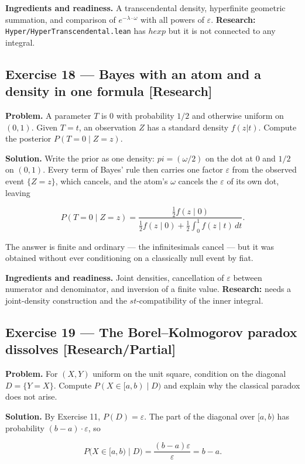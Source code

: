 \documentclass[11pt]{article}
\newcommand{\eps}{\varepsilon}
\renewcommand{\epsilon}{\varepsilon}
\begin{document}
\textbf{Ingredients and readiness.} A transcendental density, hyperfinite geometric
summation, and comparison of $e^{-\lambda\cdot \omega}$ with all powers of $\eps$.
\textbf{Research:} \texttt{Hyper/HyperTranscendental.lean} has $hexp$ but it is not
connected to any integral.


\subsection*{Exercise 18 --- Bayes with an atom and a density in one formula \hfill \normalfont\small[Research]}

\textbf{Problem.} A parameter $T$ is $0$ with probability $1/2$ and otherwise
uniform on $(0,1)$. Given $T = t$, an observation $Z$ has a standard density
$f(z | t)$. Compute the posterior $P(T = 0\mid Z = z)$.

\textbf{Solution.} Write the prior as one density: $pi = (\omega/2)$ on the dot at
$0$ and $1/2$ on $(0,1)$. Every term of Bayes' rule then carries one factor
$\eps$ from the observed event $\{Z = z\}$, which cancels, and the atom's
$\omega$ cancels the $\eps$ of its own dot, leaving

\[
P(T=0\mid Z=z)
=\frac{\tfrac12 f(z\mid 0)}
       {\tfrac12 f(z\mid 0)+\tfrac12\int_0^1 f(z\mid t)\,dt } .
\]

The answer is finite and ordinary --- the infinitesimals cancel --- but it was
obtained without ever conditioning on a classically null event by fiat.

\textbf{Ingredients and readiness.} Joint densities, cancellation of $\eps$
between numerator and denominator, and inversion of a finite value.
\textbf{Research:} needs a joint-density construction and the $st$-compatibility of
the inner integral.


\subsection*{Exercise 19 --- The Borel--Kolmogorov paradox dissolves \hfill \normalfont\small[Research/Partial]}

\textbf{Problem.} For $(X,Y)$ uniform on the unit square, condition on the diagonal
$D = \{Y = X\}$. Compute $P(X\in [a,b)\mid D)$ and explain why the classical
paradox does not arise.

\textbf{Solution.} By Exercise 11, $P(D) = \eps$. The part of the diagonal over
$[a,b)$ has probability $(b-a)\cdot \eps$, so

\[
P\big(X\in[a,b)\mid D\big)=\frac{(b-a)\epsilon}{\epsilon}=b-a .
\]
\end{document}
